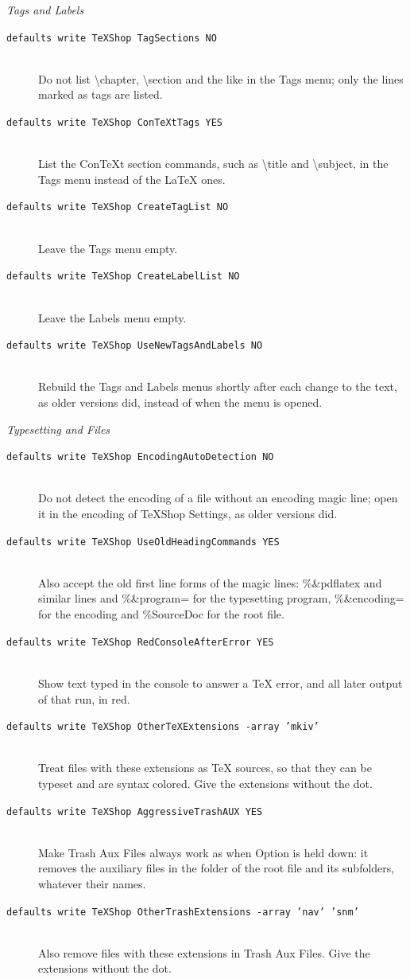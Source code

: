 \documentclass[11pt, oneside]{article}   	%
\begin{document}
{\em Tags and Labels}
\begin{description}
\item[\texttt{defaults write TeXShop TagSections NO}] \hfill \\
Do not list \textbackslash chapter, \textbackslash section and the like in the Tags menu; only the lines marked as tags are listed.
\item[\texttt{defaults write TeXShop ConTeXtTags YES}] \hfill \\
List the ConTeXt section commands, such as \textbackslash title and \textbackslash subject, in the Tags menu instead of the LaTeX ones.
\item[\texttt{defaults write TeXShop CreateTagList NO}] \hfill \\
Leave the Tags menu empty.
\item[\texttt{defaults write TeXShop CreateLabelList NO}] \hfill \\
Leave the Labels menu empty.
\item[\texttt{defaults write TeXShop UseNewTagsAndLabels NO}] \hfill \\
Rebuild the Tags and Labels menus shortly after each change to the text, as older versions did, instead of when the menu is opened.
\end{description}

{\em Typesetting and Files}
\begin{description}
\item[\texttt{defaults write TeXShop EncodingAutoDetection NO}] \hfill \\
Do not detect the encoding of a file without an encoding magic line; open it in the encoding of TeXShop Settings, as older versions did.
\item[\texttt{defaults write TeXShop UseOldHeadingCommands YES}] \hfill \\
Also accept the old first line forms of the magic lines: \%\&pdflatex and similar lines and \%\&program= for the typesetting program, \%\&encoding= for the encoding and \%SourceDoc for the root file.
\item[\texttt{defaults write TeXShop RedConsoleAfterError YES}] \hfill \\
Show text typed in the console to answer a TeX error, and all later output of that run, in red.
\item[\texttt{defaults write TeXShop OtherTeXExtensions -array 'mkiv'}] \hfill \\
Treat files with these extensions as TeX sources, so that they can be typeset and are syntax colored. Give the extensions without the dot.
\item[\texttt{defaults write TeXShop AggressiveTrashAUX YES}] \hfill \\
Make Trash Aux Files always work as when Option is held down: it removes the auxiliary files in the folder of the root file and its subfolders, whatever their names.
\item[\texttt{defaults write TeXShop OtherTrashExtensions -array 'nav' 'snm'}] \hfill \\
Also remove files with these extensions in Trash Aux Files. Give the extensions without the dot.
\end{description}
\end{document}
